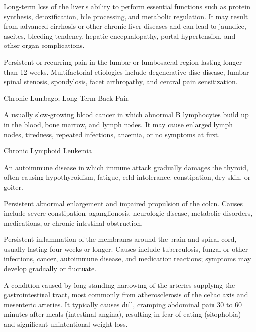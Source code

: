  Long-term loss of the liver’s ability to perform essential functions such as protein synthesis, detoxification, bile processing, and metabolic regulation. It may result from advanced cirrhosis or other chronic liver diseases and can lead to jaundice, ascites, bleeding tendency, hepatic encephalopathy, portal hypertension, and other organ complications.

 Persistent or recurring pain in the lumbar or lumbosacral region lasting longer than 12 weeks. Multifactorial etiologies include degenerative disc disease, lumbar spinal stenosis, spondylosis, facet arthropathy, and central pain sensitization.

\synonyms
Chronic Lumbago; Long-Term Back Pain

 A usually slow-growing blood cancer in which abnormal B lymphocytes build up in the blood, bone marrow, and lymph nodes. It may cause enlarged lymph nodes, tiredness, repeated infections, anaemia, or no symptoms at first.

\synonyms
Chronic Lymphoid Leukemia

 An autoimmune disease in which immune attack gradually damages the thyroid, often causing hypothyroidism, fatigue, cold intolerance, constipation, dry skin, or goiter.

 Persistent abnormal enlargement and impaired propulsion of the colon. Causes include severe constipation, aganglionosis, neurologic disease, metabolic disorders, medications, or chronic intestinal obstruction.

 Persistent inflammation of the membranes around the brain and spinal cord, usually lasting four weeks or longer. Causes include tuberculosis, fungal or other infections, cancer, autoimmune disease, and medication reactions; symptoms may develop gradually or fluctuate.

 A condition caused by long-standing narrowing of the arteries supplying the gastrointestinal tract, most commonly from atherosclerosis of the celiac axis and mesenteric arteries. It typically causes dull, cramping abdominal pain 30 to 60 minutes after meals (intestinal angina), resulting in fear of eating (sitophobia) and significant unintentional weight loss.

